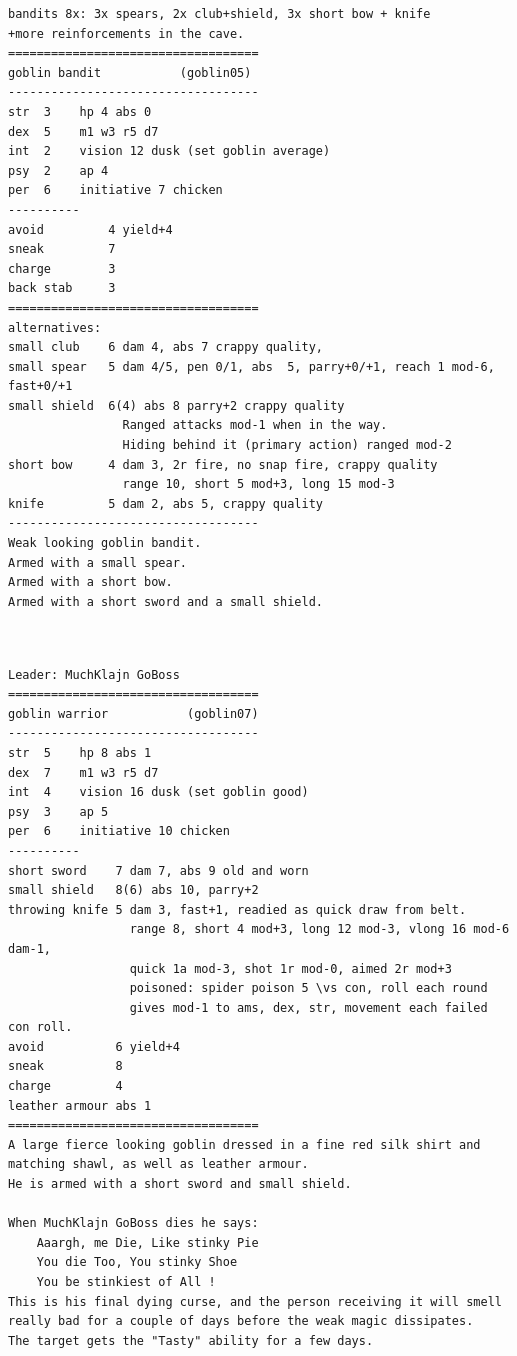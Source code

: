 \documentclass[11pt, twoside, titlepage, a4paper]{report}
\newcommand{\vs}{$\backslash\ $}  %
\begin{document}
\small\begin{verbatim}
bandits 8x: 3x spears, 2x club+shield, 3x short bow + knife
+more reinforcements in the cave.
===================================
goblin bandit           (goblin05)
-----------------------------------
str  3    hp 4 abs 0
dex  5    m1 w3 r5 d7
int  2    vision 12 dusk (set goblin average)
psy  2    ap 4
per  6    initiative 7 chicken
----------
avoid         4 yield+4
sneak         7
charge        3
back stab     3
===================================
alternatives:
small club    6 dam 4, abs 7 crappy quality,
small spear   5 dam 4/5, pen 0/1, abs  5, parry+0/+1, reach 1 mod-6, fast+0/+1
small shield  6(4) abs 8 parry+2 crappy quality
                Ranged attacks mod-1 when in the way.
                Hiding behind it (primary action) ranged mod-2
short bow     4 dam 3, 2r fire, no snap fire, crappy quality
                range 10, short 5 mod+3, long 15 mod-3
knife         5 dam 2, abs 5, crappy quality
-----------------------------------
Weak looking goblin bandit.
Armed with a small spear.
Armed with a short bow.
Armed with a short sword and a small shield.



\end{verbatim} \goodbreak \begin{verbatim}
Leader: MuchKlajn GoBoss
===================================
goblin warrior           (goblin07)
-----------------------------------
str  5    hp 8 abs 1
dex  7    m1 w3 r5 d7
int  4    vision 16 dusk (set goblin good)
psy  3    ap 5
per  6    initiative 10 chicken
----------
short sword    7 dam 7, abs 9 old and worn
small shield   8(6) abs 10, parry+2
throwing knife 5 dam 3, fast+1, readied as quick draw from belt.
                 range 8, short 4 mod+3, long 12 mod-3, vlong 16 mod-6 dam-1,
                 quick 1a mod-3, shot 1r mod-0, aimed 2r mod+3
                 poisoned: spider poison 5 \vs con, roll each round
                 gives mod-1 to ams, dex, str, movement each failed con roll.
avoid          6 yield+4
sneak          8
charge         4
leather armour abs 1
===================================
A large fierce looking goblin dressed in a fine red silk shirt and
matching shawl, as well as leather armour.
He is armed with a short sword and small shield.

When MuchKlajn GoBoss dies he says:
    Aaargh, me Die, Like stinky Pie
    You die Too, You stinky Shoe
    You be stinkiest of All !
This is his final dying curse, and the person receiving it will smell
really bad for a couple of days before the weak magic dissipates.
The target gets the "Tasty" ability for a few days.




\end{verbatim}
\end{document}

